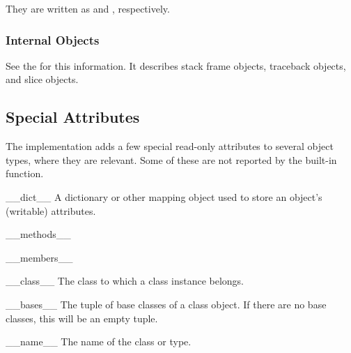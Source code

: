 They are written as  and , respectively.


\subsubsection{Internal Objects \label{typesinternal}}

See the  for this
information.  It describes stack frame objects, traceback objects, and
slice objects.


\subsection{Special Attributes \label{specialattrs}}

The implementation adds a few special read-only attributes to several
object types, where they are relevant.  Some of these are not reported
by the  built-in function.

\begin{memberdesc}[object]{__dict__}
A dictionary or other mapping object used to store an
object's (writable) attributes.
\end{memberdesc}

\begin{memberdesc}[object]{__methods__}
\end{memberdesc}

\begin{memberdesc}[object]{__members__}
\end{memberdesc}

\begin{memberdesc}[instance]{__class__}
The class to which a class instance belongs.
\end{memberdesc}

\begin{memberdesc}[class]{__bases__}
The tuple of base classes of a class object.  If there are no base
classes, this will be an empty tuple.
\end{memberdesc}

\begin{memberdesc}[class]{__name__}
The name of the class or type.
\end{memberdesc}
